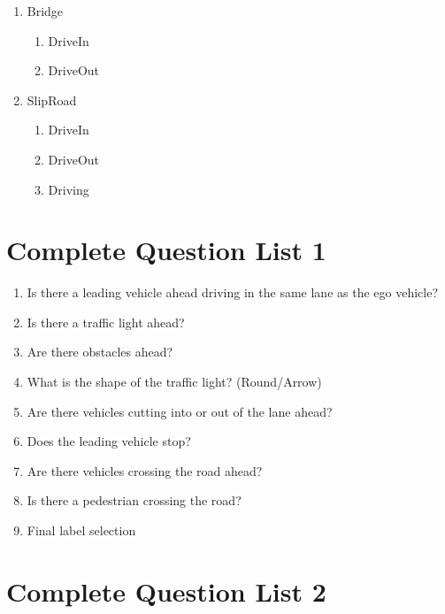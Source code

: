 \documentclass[lettersize,journal]{IEEEtran}
\begin{document}
\begin{enumerate}
    \item Bridge
    \begin{enumerate}
        \item DriveIn
        \item DriveOut
    \end{enumerate}
    
    \item SlipRoad
    \begin{enumerate}
        \item DriveIn
        \item DriveOut
        \item Driving
    \end{enumerate}
\end{enumerate}


\section{Complete Question List 1}
\label{appendix:qa_list1}

\begin{enumerate}
    \item Is there a leading vehicle ahead driving in the same lane as the ego vehicle?
    \item Is there a traffic light ahead?
    \item Are there obstacles ahead?
    \item What is the shape of the traffic light? (Round/Arrow)
    \item Are there vehicles cutting into or out of the lane ahead?
    \item Does the leading vehicle stop?
    \item Are there vehicles crossing the road ahead?
    \item Is there a pedestrian crossing the road?
    \item Final label selection
\end{enumerate}


\section{Complete Question List 2}
\label{appendix:qa_list2}
\end{document}
